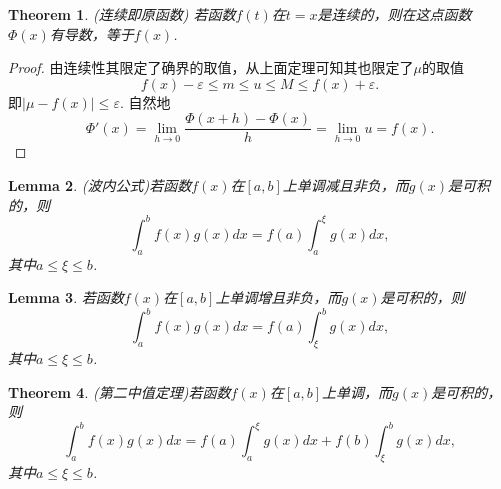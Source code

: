 \documentclass{article}
\newtheorem{theorem}{Theorem}[section]
\newtheorem{lemma}[theorem]{Lemma}
\begin{document}
\begin{theorem}
\rm {\color{red} (连续即原函数)} 若函数$f(t)$在$t=x$是连续的，则在这点函数$\Phi(x)$有导数，等于$f(x)$.
\end{theorem}

\begin{proof}
由连续性其限定了确界的取值，从上面定理可知其也限定了$\mu$的取值
$$
f(x) - \varepsilon \leq m  \leq u \leq M \leq f(x) + \varepsilon. 
$$
即$|\mu-f(x)| \leq \varepsilon$. 自然地
$$
\Phi'(x) = \lim\limits_{h \rightarrow 0} \frac{\Phi(x+h)-\Phi(x)}{h} = \lim\limits_{h \rightarrow 0} u = f(x).
$$
\end{proof}

\begin{lemma}
\rm {\color{red} (波内公式)}若函数$f(x)$在$[a,b]$上单调减且非负，而$g(x)$是可积的，则
$$
\int_a^b f(x)g(x)dx = f(a) \int_a^\xi g(x)dx,
$$
其中$a \leq \xi \leq b$.
\end{lemma}

\begin{lemma}
\rm 若函数$f(x)$在$[a,b]$上单调增且非负，而$g(x)$是可积的，则
$$
\int_a^b f(x)g(x)dx = f(a) \int_\xi^b g(x)dx,
$$
其中$a \leq \xi \leq b$.
\end{lemma}

\begin{theorem}
\rm {\color{red} (第二中值定理)}若函数$f(x)$在$[a,b]$上单调，而$g(x)$是可积的，则
$$
\int_a^b f(x)g(x)dx = f(a) \int_a^\xi g(x)dx + f(b) \int_\xi^b g(x)dx,
$$
其中$a \leq \xi \leq b$.
\end{theorem}
\end{document}
